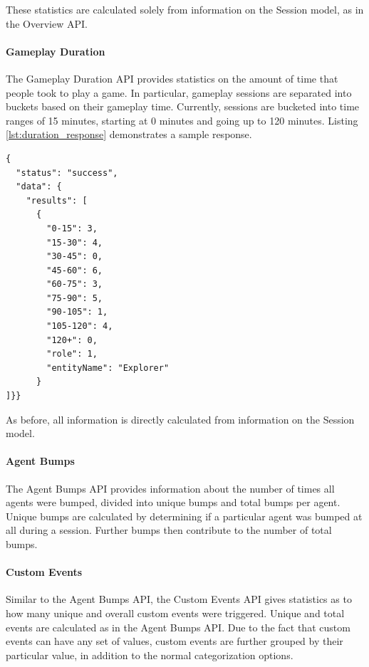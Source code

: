 These statistics are calculated solely from information on the Session model, as in the Overview API.

\paragraph{Gameplay Duration}

The Gameplay Duration API provides statistics on the amount of time that people took to play a game. In particular, gameplay sessions are separated into buckets based on their gameplay time. Currently, sessions are bucketed into time ranges of 15 minutes, starting at 0 minutes and going up to 120 minutes. Listing \ref{lst:duration_response} demonstrates a sample response.
\medskip
\begin{lstlisting}[caption={[Gameplay Duration API Response Example]Gameplay Duration API response{,} showing the number of sessions that fell within certain ranges of gameplay time{,} categorized by the Explorer role}, label={lst:duration_response}]
{
  "status": "success",
  "data": {
    "results": [
      {
        "0-15": 3,
        "15-30": 4,
        "30-45": 0,
        "45-60": 6,
        "60-75": 3,
        "75-90": 5,
        "90-105": 1,
        "105-120": 4,
        "120+": 0,
        "role": 1,
        "entityName": "Explorer"
      }
]}}
\end{lstlisting}

As before, all information is directly calculated from information on the Session model.

\paragraph{Agent Bumps}

The Agent Bumps API provides information about the number of times all agents were bumped, divided into unique bumps and total bumps per agent. Unique bumps are calculated by determining if a particular agent was bumped at all during a session. Further bumps then contribute to the number of total bumps. 

\paragraph{Custom Events}

Similar to the Agent Bumps API, the Custom Events API gives statistics as to how many unique and overall custom events were triggered. Unique and total events are calculated as in the Agent Bumps API. Due to the fact that custom events can have any set of values, custom events are further grouped by their particular value, in addition to the normal categorization options.

